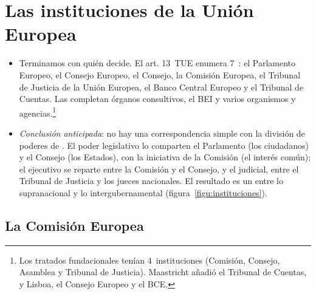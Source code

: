 \documentclass[11pt]{article}
\begin{document}
\section{Las instituciones\cortetitulo{} de la Unión Europea}\label{sec:instituciones}

\begin{itemize}
\item Terminamos con quién decide. El art. 13~TUE enumera 7~: el Parlamento Europeo, el Consejo Europeo, el Consejo, la Comisión Europea, el Tribunal de Justicia de la Unión Europea, el Banco Central Europeo y el Tribunal de Cuentas. Las completan órganos consultivos, el BEI y varios organismos y agencias.\footnote{Los tratados fundacionales tenían 4~instituciones (Comisión, Consejo, Asamblea y Tribunal de Justicia). Maastricht añadió el Tribunal de Cuentas, y Lisboa, el Consejo Europeo y el BCE.}
\item \emph{Conclusión anticipada}: no hay una correspondencia simple con la división de poderes de . El poder legislativo lo comparten el Parlamento (los ciudadanos) y el Consejo (los Estados), con la iniciativa de la Comisión (el interés común); el ejecutivo se reparte entre la Comisión y el Consejo, y el judicial, entre el Tribunal de Justicia y los jueces nacionales. El resultado es un  entre lo supranacional y lo intergubernamental (figura~\ref{figu:instituciones}).
\end{itemize}

\begin{infografia}[H]
\centering
\caption{Las instituciones de la UE: quién elige a quién y quién legisla}\label{figu:instituciones}
\end{infografia}

\subsection{La Comisión Europea}\label{sec:comision}
\end{document}
